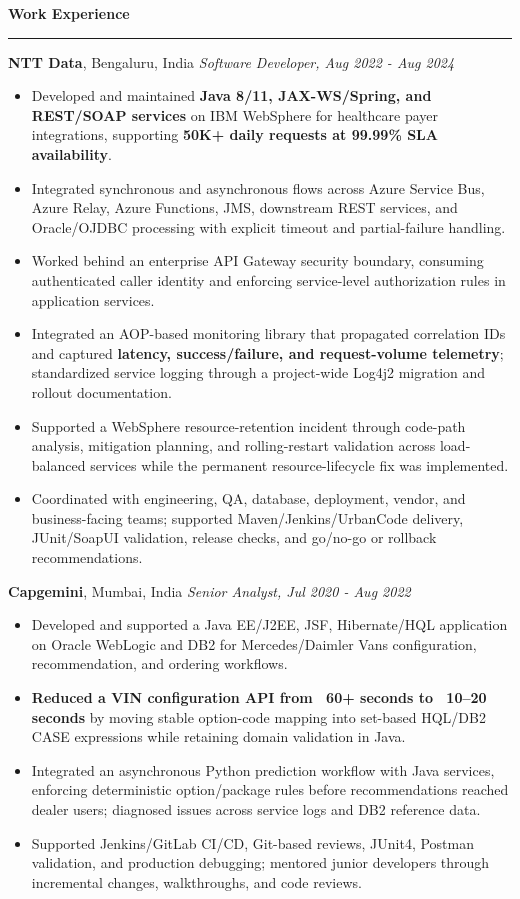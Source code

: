 \documentclass[11pt,letterpaper]{article}
\newcommand{\ressection}[1]{\Needspace{6\baselineskip}\vspace{8pt}\par\textbf{#1}\par\vspace{2pt}\hrule\vspace{5pt}}
\begin{document}
\ressection{Work Experience}
\textbf{NTT Data}, Bengaluru, India \hfill \textit{Software Developer, Aug 2022 - Aug 2024}
\begin{itemize}
  \item Developed and maintained \textbf{Java 8/11, JAX-WS/Spring, and REST/SOAP services} on IBM WebSphere for healthcare payer integrations, supporting \textbf{50K+ daily requests at 99.99\% SLA availability}.
  \item Integrated synchronous and asynchronous flows across Azure Service Bus, Azure Relay, Azure Functions, JMS, downstream REST services, and Oracle/OJDBC processing with explicit timeout and partial-failure handling.
  \item Worked behind an enterprise API Gateway security boundary, consuming authenticated caller identity and enforcing service-level authorization rules in application services.
  \item Integrated an AOP-based monitoring library that propagated correlation IDs and captured \textbf{latency, success/failure, and request-volume telemetry}; standardized service logging through a project-wide Log4j2 migration and rollout documentation.
  \item Supported a WebSphere resource-retention incident through code-path analysis, mitigation planning, and rolling-restart validation across load-balanced services while the permanent resource-lifecycle fix was implemented.
  \item Coordinated with engineering, QA, database, deployment, vendor, and business-facing teams; supported Maven/Jenkins/UrbanCode delivery, JUnit/SoapUI validation, release checks, and go/no-go or rollback recommendations.
\end{itemize}
\textbf{Capgemini}, Mumbai, India \hfill \textit{Senior Analyst, Jul 2020 - Aug 2022}
\begin{itemize}
  \item Developed and supported a Java EE/J2EE, JSF, Hibernate/HQL application on Oracle WebLogic and DB2 for Mercedes/Daimler Vans configuration, recommendation, and ordering workflows.
  \item \textbf{Reduced a VIN configuration API from ~60+ seconds to ~10--20 seconds} by moving stable option-code mapping into set-based HQL/DB2 CASE expressions while retaining domain validation in Java.
  \item Integrated an asynchronous Python prediction workflow with Java services, enforcing deterministic option/package rules before recommendations reached dealer users; diagnosed issues across service logs and DB2 reference data.
  \item Supported Jenkins/GitLab CI/CD, Git-based reviews, JUnit4, Postman validation, and production debugging; mentored junior developers through incremental changes, walkthroughs, and code reviews.
\end{itemize}
\end{document}
